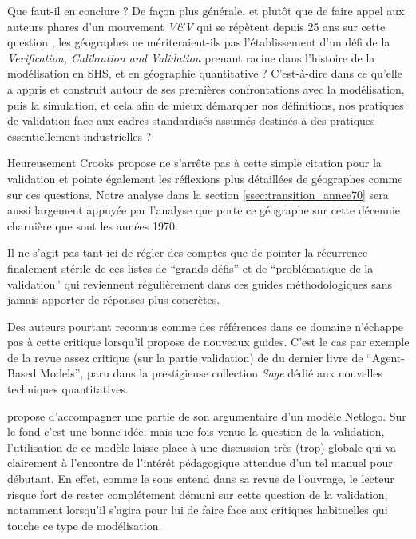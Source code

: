 Que faut-il en conclure ? De façon plus générale, et plutôt que de faire appel aux auteurs phares d'un mouvement \textit{V\&V} qui se répètent depuis 25 ans sur cette question \autocite{Sargent1983, Sargent2010}, les géographes ne mériteraient-ils pas l'établissement d'un défi de la \textit{Verification, Calibration and Validation} prenant racine dans l'histoire de la modélisation en SHS, et en géographie quantitative ? C'est-à-dire dans ce qu'elle a appris et construit autour de ses premières confrontations avec la modélisation, puis la simulation, et cela afin de mieux démarquer nos définitions, nos pratiques de validation face aux cadres standardisés assumés destinés à des pratiques essentiellement industrielles ? 

Heureusement Crooks propose ne s'arrête pas à cette simple citation pour la validation et pointe également les réflexions plus détaillées de géographes comme \textcites{Batty2001, Batty2005b} sur ces questions. Notre analyse dans la section \ref{ssec:transition_annee70} sera aussi largement appuyée par l'analyse que porte ce géographe sur cette décennie charnière que sont les années 1970.

Il ne s'agit pas tant ici de régler des comptes que de pointer la récurrence finalement stérile de ces listes de \enquote{grands défis} et de \enquote{problématique de la validation} qui reviennent régulièrement dans ces guides méthodologiques sans jamais apporter de réponses plus concrètes. 

Des auteurs pourtant reconnus comme des références dans ce domaine n'échappe pas à cette critique lorsqu'il propose de nouveaux guides. C'est le cas par exemple de la revue assez critique (sur la partie validation) de \textcite{Manzo2007a} du dernier livre de \textcite{Gilbert2008} \foreignquote{english}{Agent-Based Models}, paru dans la prestigieuse collection \textit{Sage} dédié aux nouvelles techniques quantitatives.

\textcite{Gilbert2008} propose d'accompagner une partie de son argumentaire d'un modèle Netlogo. Sur le fond c'est une bonne idée, mais une fois venue la question de la validation, l'utilisation de ce modèle laisse place à une discussion très (trop) globale qui va clairement à l'encontre de l'intérét pédagogique attendue d'un tel manuel pour débutant. En effet, comme le sous entend \textcite{Manzo2007a} dans sa revue de l'ouvrage, le lecteur risque fort de rester complétement démuni sur cette question de la validation, notamment lorsqu'il s'agira pour lui de faire face aux critiques habituelles qui touche ce type de modélisation.

